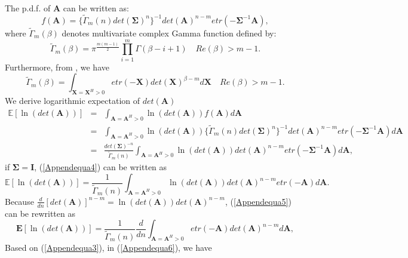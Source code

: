 \documentclass[12pt, draftclsnofoot, onecolumn]{IEEEtran}
\begin{document}
The p.d.f. of $\mathbf{A}$ can be written as\cite{nagar2011expectations}:
\begin{equation}
f(\mathbf{A})=\{\tilde{\Gamma}_{m}(n)det(\mathbf{\Sigma})^{n} \}^{-1}det(\mathbf{A})^{n-m}etr(-\mathbf{\Sigma}^{-1}\mathbf{A}),
\label{Appendequa1}
\end{equation}
where $\tilde{\Gamma}_{m}(\beta)$ denotes multivariate complex Gamma function defined by\cite{nagar2011expectations}:
\begin{equation}
\tilde{\Gamma}_{m}(\beta)=\pi^{\frac{m(m-1)}{2}}\prod_{i=1}^{m}\Gamma(\beta-i+1)\quad Re(\beta)>m-1.
\label{Appendequa2}
\end{equation}
Furthermore, from \cite{nagar2011expectations}, we have 
\begin{equation}
\tilde{\Gamma}_{m}(\beta)=\int_{\mathbf{X}=\mathbf{X}^{H}>0}etr(-\mathbf{X})det(\mathbf{X})^{\beta-m}d
\mathbf{X} \quad Re(\beta)>m-1.
\label{Appendequa3}
\end{equation}
We derive logarithmic expectation of $det(\mathbf{A})$
\begin{eqnarray}
\nonumber
\mathbb{E}[\ln(det(\mathbf{A}))]&=&\int_{\mathbf{A}=\mathbf{A}^{H}>0}\ln(det(\mathbf{A}))f(\mathbf{A})d\mathbf{A}\\
\nonumber
&=&\int_{\mathbf{A}=\mathbf{A}^{H}>0}\ln(det(\mathbf{A}))\{\tilde{\Gamma}_{m}(n)det(\mathbf{\Sigma})^{n} \}^{-1}det(\mathbf{A})^{n-m}etr(-\mathbf{\Sigma}^{-1}\mathbf{A})d\mathbf{A}\\
&=&\frac{det(\mathbf{\Sigma})^{-n}}{\tilde{\Gamma}_{m}(n)}\int_{\mathbf{A}=\mathbf{A}^{H}>0}\ln(det(\mathbf{A}))det(\mathbf{A})^{n-m}etr(-\mathbf{\Sigma}^{-1}\mathbf{A})d\mathbf{A},
\label{Appendequa4}
\end{eqnarray}
if $\mathbf{\Sigma}=\mathbf{I}$, (\ref{Appendequa4}) can be written as 
\begin{equation}
\mathbb{E}[\ln(det(\mathbf{A}))]=\frac{1}{\tilde{\Gamma}_{m}(n)}\int_{\mathbf{A}=\mathbf{A}^{H}>0}\ln(det(\mathbf{A}))det(\mathbf{A})^{n-m}etr(-\mathbf{A})d\mathbf{A}.
\label{Appendequa5}
\end{equation}
Because $\frac{d}{dn}[det(\mathbf{A})]^{n-m}=\ln(det(\mathbf{A}))det(\mathbf{A})^{n-m}$, (\ref{Appendequa5}) can be rewritten as
\begin{equation}
\mathbf{E}[\ln(det(\mathbf{A}))]=\frac{1}{\tilde{\Gamma}_{m}(n)}\frac{d}{dn}\int_{\mathbf{A}=\mathbf{A}^{H}>0}etr(-\mathbf{A})det(\mathbf{A})^{n-m}d\mathbf{A},
\label{Appendequa6}
\end{equation}
Based on (\ref{Appendequa3}), in (\ref{Appendequa6}), we have  
\end{document}
